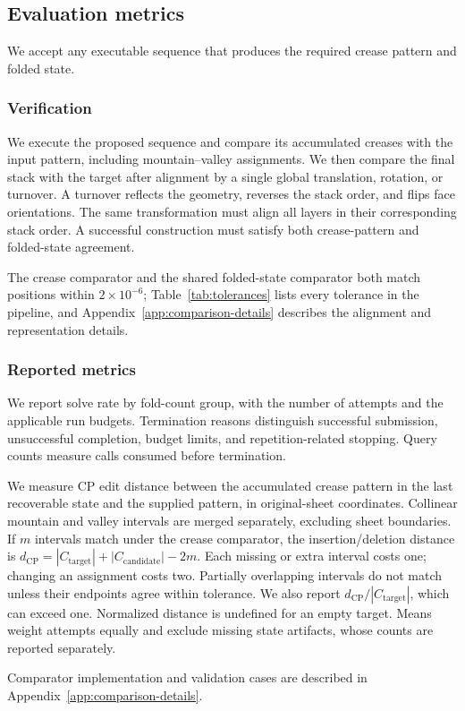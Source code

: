 \subsection{Evaluation metrics}
\label{sec:scoring}

\label{sec:scoring-why}
We accept any executable sequence that produces the required crease pattern and folded state.

\subsubsection{Verification}
\label{sec:scoring-what}

We execute the proposed sequence and compare its accumulated creases with the input pattern,
including mountain--valley assignments. We then compare the final stack with the target after
alignment by a single global translation, rotation, or turnover. A turnover reflects the geometry,
reverses the stack order, and flips face orientations. The same transformation must align all
layers in their corresponding stack order.
A successful construction must satisfy both crease-pattern and folded-state agreement.

The crease comparator and the shared folded-state
comparator both match positions within $2\times10^{-6}$; Table~\ref{tab:tolerances} lists every
tolerance in the pipeline, and Appendix~\ref{app:comparison-details} describes the alignment and
representation details.

\subsubsection{Reported metrics}
\label{sec:scoring-metrics}

We report solve rate by fold-count group, with the number of attempts and the applicable run
budgets. Termination reasons distinguish successful submission, unsuccessful completion, budget
limits, and repetition-related stopping. Query counts measure calls consumed before termination.

We measure CP edit distance between the accumulated crease pattern in the last recoverable
state and the supplied pattern, in original-sheet coordinates. Collinear mountain and valley
intervals are merged separately, excluding sheet boundaries. If $m$ intervals match under the
crease comparator, the insertion/deletion distance is
$d_{\mathrm{CP}}=|C_{\mathrm{target}}|+|C_{\mathrm{candidate}}|-2m$.
Each missing or extra interval costs one; changing an assignment costs two. Partially overlapping
intervals do not match unless their endpoints agree within tolerance. We also report
$d_{\mathrm{CP}}/|C_{\mathrm{target}}|$, which can exceed one. Normalized distance is undefined
for an empty target. Means weight attempts equally and exclude missing state artifacts,
whose counts are reported separately.

\label{sec:scoring-validate}
Comparator implementation and validation cases are described in
Appendix~\ref{app:comparison-details}.
